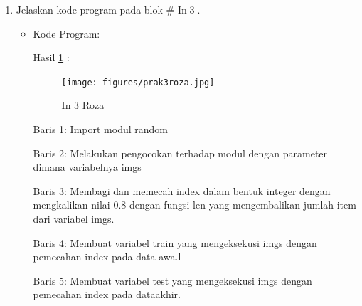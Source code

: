 \begin{enumerate}
\item Jelaskan kode program pada blok \# In[3].
\begin{itemize}
\item Kode Program:

\par Hasil \ref{in3roza} :
\begin{figure}[!hbtp]
\centering
\texttt{[image: figures/prak3roza.jpg]}
\caption{In 3 Roza}
\label{in3roza}
\end{figure}
\par Baris 1: Import modul random
\par Baris 2: Melakukan pengocokan terhadap modul dengan parameter dimana variabelnya imgs
\par Baris 3: Membagi dan memecah index dalam bentuk integer dengan mengkalikan nilai 0.8 dengan fungsi len yang mengembalikan jumlah item dari variabel imgs.
\par Baris 4: Membuat variabel train yang mengeksekusi imgs dengan pemecahan index pada data awa.l
\par Baris 5: Membuat variabel test yang mengeksekusi imgs dengan pemecahan index pada dataakhir.

\end{itemize}
\par


\end{enumerate}
